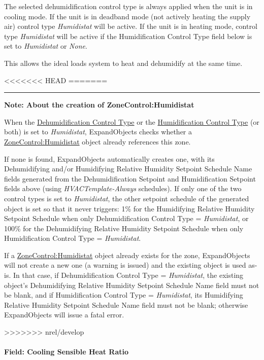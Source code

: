 The selected dehumidification control type is always applied when the unit is in cooling mode. If the unit is in deadband mode (not actively heating the supply air) control type \emph{Humidistat} will be active. If the unit is in heating mode, control type \emph{Humidistat} will be active if the Humidification Control Type field below is set to \emph{Humidistat} or \emph{None}.

This allows the ideal loads system to heat and dehumidify at the same time.

<<<<<<< HEAD
=======
\begin{center}\rule{0.5\linewidth}{0.4pt}\end{center}

\textbf{Note: About the creation of ZoneControl:Humidistat}

When the \hyperref[field-dehumidification-control-type-000]{Dehumidification Control Type} or the \hyperref[field-humidification-control-type]{Humidification Control Type} (or both) is set to \emph{Humidistat}, ExpandObjects checks whether a \hyperref[zonecontrolhumidistat]{ZoneControl:Humidistat} object already references this zone.

If none is found, ExpandObjects automatically creates one, with its Dehumidifying and/or Humidifying Relative Humidity Setpoint Schedule Name fields generated from the Dehumidification Setpoint and Humidification Setpoint fields above (using \emph{HVACTemplate-Always} schedules).
If only one of the two control types is set to \emph{Humidistat}, the other setpoint schedule of the generated object is set so that it never triggers: 1\% for the Humidifying Relative Humidity Setpoint Schedule when only Dehumidification Control Type = \emph{Humidistat}, or 100\% for the Dehumidifying Relative Humidity Setpoint Schedule when only Humidification Control Type = \emph{Humidistat}.

If a \hyperref[zonecontrolhumidistat]{ZoneControl:Humidistat} object already exists for the zone, ExpandObjects will not create a new one (a warning is issued) and the existing object is used as-is. In that case, if Dehumidification Control Type = \emph{Humidistat}, the existing object's Dehumidifying Relative Humidity Setpoint Schedule Name field must not be blank, and if Humidification Control Type = \emph{Humidistat}, its Humidifying Relative Humidity Setpoint Schedule Name field must not be blank; otherwise ExpandObjects will issue a fatal error.


>>>>>>> nrel/develop
\paragraph{Field: Cooling Sensible Heat Ratio}\label{field-cooling-sensible-heat-ratio}

